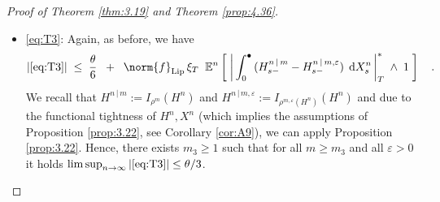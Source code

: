 \documentclass[11pt]{article}
\theoremstyle{definition}\newtheorem{example}[theorem]{Example}
\theoremstyle{definition}\newtheorem{counterexample}[theorem]{Counterexample}
\theoremstyle{definition}\newtheorem{remark}[theorem]{Remark}
\theoremstyle{definition}\newtheorem{defi}[theorem]{Definition}
\numberwithin{equation}{section}
\newcommand*\diff{\mathop{}\!\mathrm{d}}								%
\newcommand{\E}{\mathbb{E}}											%
\newcommand{\Pro}{\mathbb{P}}										%
\renewcommand{\sup}[1]{\underset{#1}{\operatorname{sup}}\;}					%
\renewcommand{\|}{\; : \, \;}											%
\begin{document}
\begin{proof}[Proof of Theorem \ref{thm:3.19} and Theorem \ref{prop:4.36}]
\begin{itemize}
		as $\varepsilon \to 0$, due to the tightness of $(|M^n|^*_T)_{n\ge 1}$ and the fact that $\beta, \delta,\gamma$ were arbitrary (first choose $\beta$ small enough and $\delta$ large enough to make the first and last term small, then increase $\gamma$ to downsize the third term and finally let $\varepsilon \to \infty$).
		Furthermore,  by basic properties of Lebesgue-Stieltjes integration, it is true that 
		$$ \left| \, \int_0^\bullet \, (H_{s-}^n - H^{n \, \vert \, m,\varepsilon}_{s-}) \; \diff A^{n}_s \, \right|^*_{T} \; \le \; \varepsilon \, \operatorname{TV}_{[0,T]}(A^{n})$$
		and therefore, by tightness of the total variation of the $A^n$ over compacts,
		$$ \E^n\left[ \; \left| \, \int_0^\bullet \, (H_{s-}^n - H^{n \, \vert \, m,\varepsilon}_{s-}) \; \diff A^{n}_s \, \right|^*_{T}  \; \wedge \; 1 \, \right]  \; \le \;  \beta  +  \Pro^n\left( \; \operatorname{TV}_{[0,T]}(A^{n}) \, > \, \beta / \varepsilon  \; \right) \; \longrightarrow  \;  \; \beta $$
		as $\varepsilon \to 0$ and hence, since $\beta$ was arbitrary,
		$$ \sup{n,m\, \ge \, 1}\; \E^n\left[ \; \left| \, \int_0^\bullet \, (H_{s-}^n - H^{n \, \vert \, m,\varepsilon}_{s-}) \; \diff A^{n}_s \, \right|^*_{T}  \; \wedge \; 1 \, \right]   \; \longrightarrow\;  \; 0 \; .$$
		Thus, there exists $\varepsilon_{4}>0$ such that for all $0 < \varepsilon \le \varepsilon_{4}$, $m\ge 1$ and $n\ge 1$ large enough it holds
		$$ \norm{f}_{\operatorname{Lip}} \, \xi_T \; \; \E^n\left[ \; \left| \, \int_0^\bullet \, (H_{s-}^n - H^{n \, \vert \, m,\varepsilon}_{s-}) \; \diff X^n_s \, \right|^*_T \; \wedge \; 1 \;  \right]  \; \le \; \frac \theta {6} \quad . $$
		
		Hence, similarly as in the first step of the consideration of \eqref{eq:T1}, we obtain $|\eqref{eq:T4}| \le \theta/3$ for all $0<\varepsilon\le\varepsilon_4$, $m\ge 1$ and $n\ge 1$ large enough.
		
		
		\item \eqref{eq:T3}: Again, as before, we have 
		\begin{align*}
			|\eqref{eq:T3}| \; \le \; \frac \theta 6 \; \; + \; \; \norm{f}_{\operatorname{Lip}} \, \xi_T \; \;  \E^n\left[ \; \left| \, \int_0^\bullet \, (H^{n \, \vert \, m}_{s-} - H^{n \, \vert \, m,\varepsilon}_{s-}) \; \diff X^n_s \, \right|^*_T \; \wedge \; 1 \; \right]\quad .
		\end{align*}
		We recall that $H^{n\, \vert \, m}:= I_{\rho^m}(H^n)$ and $H^{n \, \vert \, m, \varepsilon}:= I_{\rho^{m,\varepsilon}(H^n)}(H^n)$ and due to the functional tightness of $H^n, X^n$ (which implies the assumptions of Proposition \ref{prop:3.22}, see Corollary \ref{cor:A9}), we can apply Proposition \ref{prop:3.22}. Hence, there exists $m_3\ge 1$ such that for all $m\ge m_3$ and all $\varepsilon>0$ it holds $\limsup_{n\to \infty}  |\eqref{eq:T3}|  \le \theta/3$.
		

\end{itemize}
\end{proof}
\end{document}
